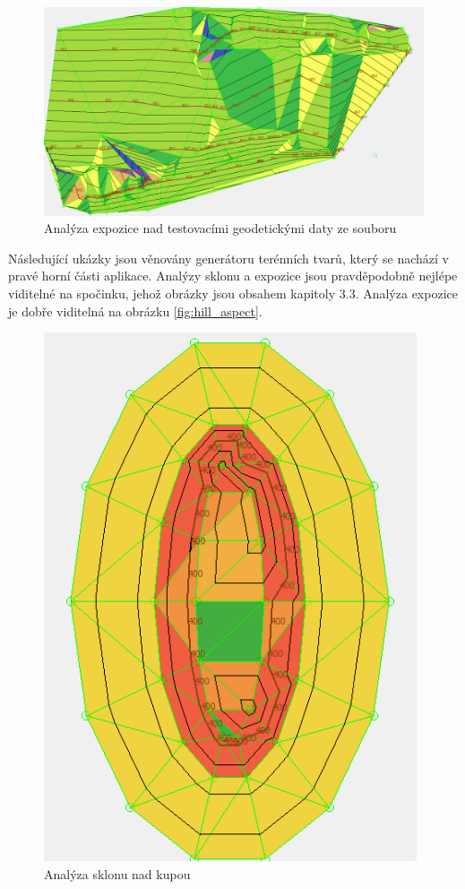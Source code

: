 \documentclass[a4paper,11pt,twoside]{article}
\begin{document}
\begin{figure}[hbt!] 
\begin{center}
\includegraphics[width=13cm]{pictures/data_aspect.PNG} 
\caption[Analýza expozice nad testovacími geodetickými daty ze souboru]{Analýza expozice nad testovacími geodetickými daty ze souboru}
\label{fig:data_aspect}
\end{center}
\end{figure}

Následující ukázky jsou věnovány generátoru terénních tvarů, který se nachází v pravé horní části aplikace. Analýzy sklonu a expozice jsou pravděpodobně nejlépe viditelné na spočinku, jehož obrázky jsou obsahem kapitoly 3.3. Analýza expozice je dobře viditelná na obrázku \ref{fig:hill_aspect}. 

\vspace{0.2cm}
\begin{figure}[hbt!] 
\begin{center}
\includegraphics[width=11cm]{pictures/hill_slope.PNG} 
\caption[Analýza sklonu nad kupou]{Analýza sklonu nad kupou}
\label{fig:hill_slope}
\end{center}
\end{figure}
\end{document}
